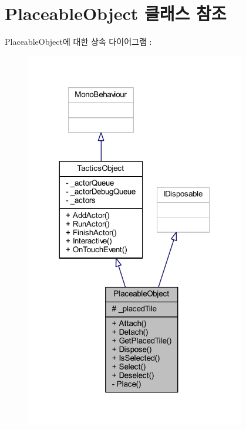 \hypertarget{class_placeable_object}{}\section{Placeable\+Object 클래스 참조}
\label{class_placeable_object}


Placeable\+Object에 대한 상속 다이어그램 \+: \nopagebreak
\begin{figure}[H]
\begin{center}
\leavevmode
\includegraphics[width=272pt]{class_placeable_object__inherit__graph}
\end{center}
\end{figure}


